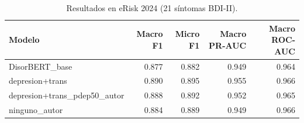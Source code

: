\begin{table}[htbp]
\centering
\caption{Resultados en eRisk 2024 (21 síntomas BDI-II).}
\label{tab:erisk_bdi21}
\begin{tabular}{lrrrr}
\toprule
Modelo & Macro F1 & Micro F1 & Macro PR-AUC & Macro ROC-AUC \\
\midrule
DisorBERT\_base & 0.877 & 0.882 & 0.949 & 0.964 \\
depresion+trans & 0.890 & 0.895 & 0.955 & 0.966 \\
depresion+trans\_pdep50\_autor & 0.888 & 0.892 & 0.952 & 0.965 \\
ninguno\_autor & 0.884 & 0.889 & 0.949 & 0.966 \\
\bottomrule
\end{tabular}
\end{table}
